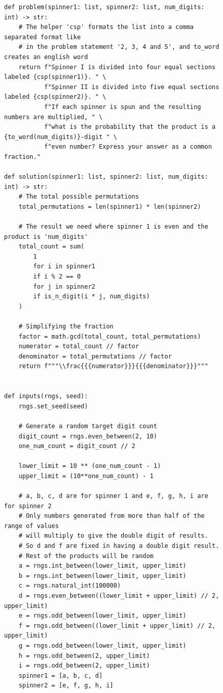 \documentclass[11pt,a4paper]{article}
\begin{document}
\begin{figure}
\vspace{-2em}
\small
\begin{verbatim}
def problem(spinner1: list, spinner2: list, num_digits: int) -> str:
    # The helper 'csp' formats the list into a comma separated format like
    # in the problem statement '2, 3, 4 and 5', and to_word creates an english word
    return f"Spinner I is divided into four equal sections labeled {csp(spinner1)}. " \
           f"Spinner II is divided into five equal sections labeled {csp(spinner2)}. " \
           f"If each spinner is spun and the resulting numbers are multiplied, " \
           f"what is the probability that the product is a {to_word(num_digits)}-digit " \
           f"even number? Express your answer as a common fraction."

def solution(spinner1: list, spinner2: list, num_digits: int) -> str:
    # The total possible permutations
    total_permutations = len(spinner1) * len(spinner2)

    # The result we need where spinner 1 is even and the product is 'num_digits'
    total_count = sum(
        1
        for i in spinner1
        if i % 2 == 0
        for j in spinner2
        if is_n_digit(i * j, num_digits)
    )

    # Simplifying the fraction
    factor = math.gcd(total_count, total_permutations)
    numerator = total_count // factor
    denominator = total_permutations // factor
    return f"""\\frac{{{numerator}}}{{{denominator}}}"""


def inputs(rngs, seed):
    rngs.set_seed(seed)

    # Generate a random target digit count
    digit_count = rngs.even_between(2, 10)
    one_num_count = digit_count // 2

    lower_limit = 10 ** (one_num_count - 1)
    upper_limit = (10**one_num_count) - 1

    # a, b, c, d are for spinner 1 and e, f, g, h, i are for spinner 2
    # Only numbers generated from more than half of the range of values
    # will multiply to give the double digit of results.
    # So d and f are fixed in having a double digit result.
    # Rest of the products will be random
    a = rngs.int_between(lower_limit, upper_limit)
    b = rngs.int_between(lower_limit, upper_limit)
    c = rngs.natural_int(100000)
    d = rngs.even_between((lower_limit + upper_limit) // 2, upper_limit)
    e = rngs.odd_between(lower_limit, upper_limit)
    f = rngs.odd_between((lower_limit + upper_limit) // 2, upper_limit)
    g = rngs.odd_between(lower_limit, upper_limit)
    h = rngs.odd_between(2, upper_limit)
    i = rngs.odd_between(2, upper_limit)
    spinner1 = [a, b, c, d]
    spinner2 = [e, f, g, h, i]


\end{verbatim}
\end{figure}
\end{document}
